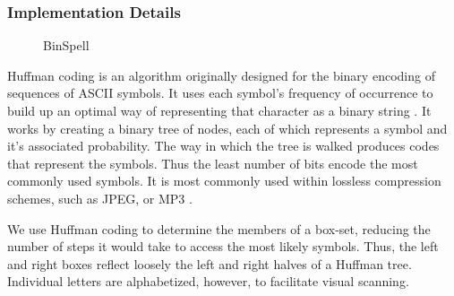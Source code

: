 \documentclass[12pt,titlepage]{article}
\begin{document}
\subsubsection{Implementation Details}

\begin{figure}
\centering
{}
\caption{BinSpell}
\label{fig:Bin}
\end{figure}

Huffman coding is an algorithm originally designed for the binary encoding of sequences of ASCII 
symbols.  It uses each symbol's frequency of occurrence to build up an optimal way of representing that 
character as a binary string \cite{cormen_introduction_2001}.  It works by creating a binary tree of nodes, each of which represents a 
symbol and it's associated probability. The way in which the tree is walked produces codes that 
represent the symbols.  Thus the least number of bits encode the most commonly used symbols.  It is 
most commonly used within lossless compression schemes, such as JPEG, or MP3 \cite{cormen_introduction_2001}.

We use Huffman coding to determine the members of a box-set,  reducing the number of steps it would 
take to access the most likely symbols.  Thus, the left and right boxes reflect loosely the left and right 
halves of a Huffman tree.  Individual letters are alphabetized, however, to facilitate visual scanning.
\end{document}
